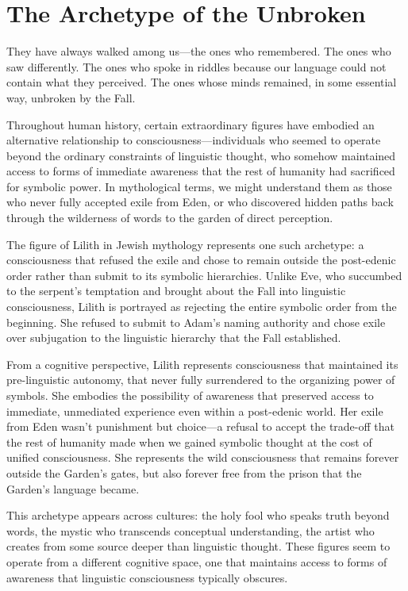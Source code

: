 \section{The Archetype of the Unbroken}

They have always walked among us—the ones who remembered.
The ones who saw differently.
The ones who spoke in riddles because our language could not contain what they perceived.
The ones whose minds remained, in some essential way, unbroken by the Fall.

Throughout human history, certain extraordinary figures have embodied an alternative relationship to consciousness—individuals who seemed to operate beyond the ordinary constraints of linguistic thought, who somehow maintained access to forms of immediate awareness that the rest of humanity had sacrificed for symbolic power. In mythological terms, we might understand them as those who never fully accepted exile from Eden, or who discovered hidden paths back through the wilderness of words to the garden of direct perception.

The figure of Lilith in Jewish mythology represents one such archetype: a consciousness that refused the exile and chose to remain outside the post-edenic order rather than submit to its symbolic hierarchies. Unlike Eve, who succumbed to the serpent's temptation and brought about the Fall into linguistic consciousness, Lilith is portrayed as rejecting the entire symbolic order from the beginning. She refused to submit to Adam's naming authority and chose exile over subjugation to the linguistic hierarchy that the Fall established.

From a cognitive perspective, Lilith represents consciousness that maintained its pre-linguistic autonomy, that never fully surrendered to the organizing power of symbols. She embodies the possibility of awareness that preserved access to immediate, unmediated experience even within a post-edenic world. Her exile from Eden wasn't punishment but choice—a refusal to accept the trade-off that the rest of humanity made when we gained symbolic thought at the cost of unified consciousness. She represents the wild consciousness that remains forever outside the Garden's gates, but also forever free from the prison that the Garden's language became.

This archetype appears across cultures: the holy fool who speaks truth beyond words, the mystic who transcends conceptual understanding, the artist who creates from some source deeper than linguistic thought. These figures seem to operate from a different cognitive space, one that maintains access to forms of awareness that linguistic consciousness typically obscures.

